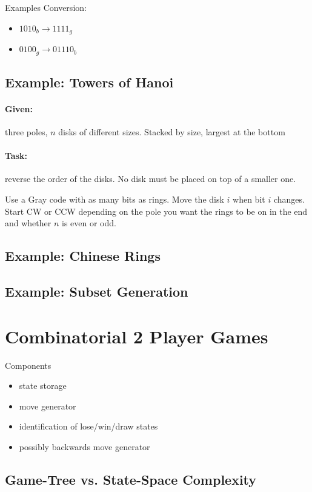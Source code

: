\documentclass[11pt]{article}
\begin{document}
Examples Conversion:
\begin{itemize}
\item $ 1010_b \rightarrow 1111_g $
\item $ 0100_g \rightarrow 01110_b $
\end{itemize}

\subsection{Example: Towers of Hanoi}

\paragraph{Given:} three poles, $ n $ disks of different sizes. Stacked by size, largest at the bottom

\paragraph{Task:} reverse the order of the disks. No disk must be placed on top of a smaller one.

Use a Gray code with as many bits as rings. Move the disk $ i $ when bit $ i $ changes. Start CW or CCW depending on the pole you want the rings to be on in the end and whether $ n $ is even or odd.

\subsection{Example: Chinese Rings}

\subsection{Example: Subset Generation}


\section{Combinatorial 2 Player Games}

Components
\begin{itemize}
\item state storage
\item move generator
\item identification of lose/win/draw states
\item possibly backwards move generator
\end{itemize}


\subsection{Game-Tree vs. State-Space Complexity}
\end{document}
